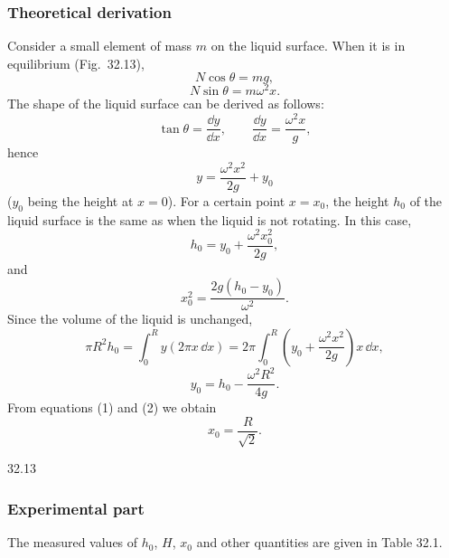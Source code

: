 \subsubsection*{Theoretical derivation}

Consider a small element of mass $m$ on the liquid surface. When it is in equilibrium (Fig.~32.13),
\[
N\cos\theta=mg,
\]
\[
N\sin\theta=m\omega^2x.
\]
The shape of the liquid surface can be derived as follows:
\[
\tan\theta=\frac{\dd y}{\dd x},\qquad \frac{\dd y}{\dd x}=\frac{\omega^2x}{g},
\]
hence
\[
y=\frac{\omega^2x^2}{2g}+y_0
\]
($y_0$ being the height at $x=0$). For a certain point $x=x_0$, the height $h_0$ of the liquid surface is the same as when the liquid is not rotating. In this case,
\begin{equation}
h_0=y_0+\frac{\omega^2x_0^2}{2g}, \tag{1}
\end{equation}
and
\[
x_0^2=\frac{2g(h_0-y_0)}{\omega^2}.
\]
Since the volume of the liquid is unchanged,
\[
\pi R^2h_0=\int_0^R y(2\pi x\,\dd x)
=2\pi\int_0^R\left(y_0+\frac{\omega^2x^2}{2g}\right)x\,\dd x,
\]
\begin{equation}
y_0=h_0-\frac{\omega^2R^2}{4g}. \tag{2}
\end{equation}
From equations (1) and (2) we obtain
\[
x_0=\frac{R}{\sqrt{2}}.
\]

\begin{figbox}{32.13}
\end{figbox}

\subsubsection*{Experimental part}

The measured values of $h_0$, $H$, $x_0$ and other quantities are given in Table 32.1.

